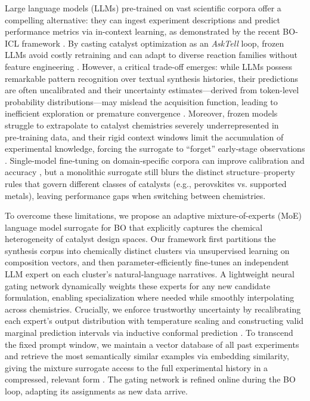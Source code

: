\documentclass{article}
\begin{document}
Large language models (LLMs) pre-trained on vast scientific corpora offer a compelling alternative: they can ingest experiment descriptions and predict performance metrics via in-context learning, as demonstrated by the recent BO-ICL framework \cite{ramos2023boicl}. By casting catalyst optimization as an \emph{AskTell} loop, frozen LLMs avoid costly retraining and can adapt to diverse reaction families without feature engineering \cite{jablonka2024leveraging, flam-shepherd2022language}. However, a critical trade-off emerges: while LLMs possess remarkable pattern recognition over textual synthesis histories, their predictions are often uncalibrated and their uncertainty estimates—derived from token-level probability distributions—may mislead the acquisition function, leading to inefficient exploration or premature convergence \cite{guo2017calibration, angelopoulos2020conformal}. Moreover, frozen models struggle to extrapolate to catalyst chemistries severely underrepresented in pre‑training data, and their rigid context windows limit the accumulation of experimental knowledge, forcing the surrogate to “forget” early-stage observations \cite{ramos2023boicl}. Single‑model fine‑tuning on domain‑specific corpora can improve calibration and accuracy \cite{liu2021gpt3finetune, xie2023llmscience}, but a monolithic surrogate still blurs the distinct structure–property rules that govern different classes of catalysts (e.g., perovskites vs. supported metals), leaving performance gaps when switching between chemistries.

To overcome these limitations, we propose an adaptive mixture-of-experts (MoE) language model surrogate for BO that explicitly captures the chemical heterogeneity of catalyst design spaces. Our framework first partitions the synthesis corpus into chemically distinct clusters via unsupervised learning on composition vectors, and then parameter‑efficiently fine‑tunes an independent LLM expert on each cluster’s natural‑language narratives. A lightweight neural gating network dynamically weights these experts for any new candidate formulation, enabling specialization where needed while smoothly interpolating across chemistries. Crucially, we enforce trustworthy uncertainty by recalibrating each expert’s output distribution with temperature scaling and constructing valid marginal prediction intervals via inductive conformal prediction \cite{angelopoulos2020conformal, guo2017calibration}. To transcend the fixed prompt window, we maintain a vector database of all past experiments and retrieve the most semantically similar examples via embedding similarity, giving the mixture surrogate access to the full experimental history in a compressed, relevant form \cite{lewis2020retrieval, borgeaud2022retrieval}. The gating network is refined online during the BO loop, adapting its assignments as new data arrive.
\end{document}
